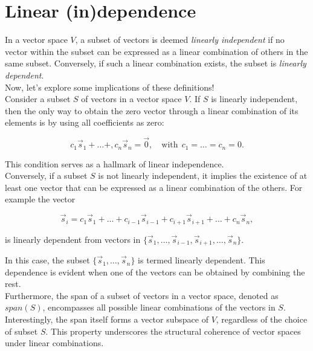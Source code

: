 \section{Linear (in)dependence}

In a vector space $V$, a subset of vectors is deemed \emph{linearly independent} if no vector within the subset can be expressed as a linear combination of others in the same subset. Conversely, if such a linear combination exists, the subset is \emph{linearly dependent}.
\\

Now, let's explore some implications of these definitions!
\\

Consider a subset $S$ of vectors in a vector space $V$. If $S$ is linearly independent, then the only way to obtain the zero vector through a linear combination of its elements is by using all coefficients as zero:

$$
c_1 \vec s_1 + \dots +, c_n \vec s_n = \vec 0, \quad \text{with} \ \ c_1 = \dots = c_n = 0 .
$$

This condition serves as a hallmark of linear independence.
\\

Conversely, if a subset $S$ is not linearly independent, it implies the existence of at least one vector that can be expressed as a linear combination of the others. For example the vector 

$$
\vec s_i = c_1 \vec s_1 + \dots + c_{i-1} \vec s_{i-1} + c_{i+1} \vec s_{i+1} + \dots + c_n \vec s_n,
$$

is linearly dependent from vectors in $\{\vec s_1, \dots, \vec s_{i-1}, \vec s_{i+1}, \dots, \vec s_n\}$.

In this case, the subset $\{\vec s_1, \dots, \vec s_n\}$ is termed linearly dependent. This dependence is evident when one of the vectors can be obtained by combining the rest.
\\

Furthermore, the span of a subset of vectors in a vector space, denoted as $span(S)$, encompasses all possible linear combinations of the vectors in $S$. Interestingly, the span itself forms a vector subspace of $V$, regardless of the choice of subset $S$. This property underscores the structural coherence of vector spaces under linear combinations.
\\

